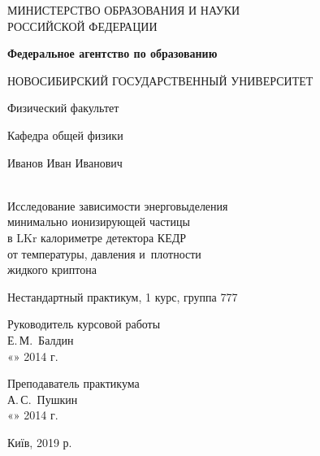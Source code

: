 \documentclass[]{lib/styles/additional-docs}
\begin{document}
\begin{titlepage}
    \begin{center}
      \large
      МИНИСТЕРСТВО ОБРАЗОВАНИЯ И НАУКИ\\ РОССИЙСКОЙ ФЕДЕРАЦИИ
       
      \textbf{Федеральное агентство по образованию}
      \vspace{0.5cm}
   
      НОВОСИБИРСКИЙ ГОСУДАРСТВЕННЫЙ УНИВЕРСИТЕТ
      \vspace{0.25cm}
       
      Физический факультет
       
      Кафедра общей физики
      \vfill
       
       
      Иванов Иван Иванович
      \vfill
   
      \\[5mm]
       
      {\LARGE Исследование зависимости энерговыделения\\
        минимально ионизирующей частицы\\
      в LKr калориметре детектора КЕДР\\
      от температуры, давления и~плотности\\[2mm]
      жидкого криптона}
    \bigskip
       
      Нестандартный практикум, 1 курс, группа 777
  \end{center}
  \vfill
   
  \newlength{\ML}
  \hfill\begin{minipage}{0.4\textwidth}
    Руководитель курсовой работы\\
    \underline{\hspace{\ML}} Е.\,М.~Балдин\\
    «\underline{\hspace{0.7cm}}» \underline{\hspace{2cm}} 2014 г.
  \end{minipage}%
  \bigskip
   
  \hfill\begin{minipage}{0.4\textwidth}
    Преподаватель практикума\\
    \underline{\hspace{\ML}} А.\,С.~Пушкин\\
    «\underline{\hspace{0.7cm}}» \underline{\hspace{2cm}} 2014 г.
  \end{minipage}%
  \vfill
   
  \begin{center}
    Київ, 2019 р.
  \end{center}
  \end{titlepage}
\end{document}
